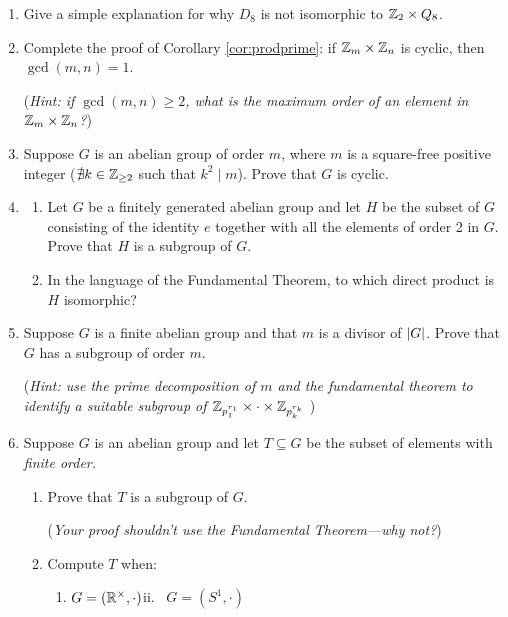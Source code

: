 \begin{exercises}
\begin{enumerate}
		
		\item Give a simple explanation for why $D_8$ is not isomorphic to $\mathbb{Z}_2\times Q_8$.
		
		
		\item\label{exs:corprodprime} Complete the proof of Corollary \ref{cor:prodprime}: if $\mathbb{Z}_m\times\mathbb{Z}_n$ is cyclic, then $\gcd(m,n)=1$.\par
		(\emph{Hint: if $\gcd(m,n)\ge 2$, what is the maximum order of an element in $\mathbb{Z}_m\times\mathbb{Z}_n$?})
	
	
		\item Suppose $G$ is an abelian group of order $m$, where $m$ is a square-free positive integer ($\nexists k\in \mathbb{Z}_{\ge 2}$ such that $k^2\!\mid\! m$). Prove that $G$ is cyclic.
	
	
		\item\begin{enumerate}
	  	\item Let $G$ be a finitely generated abelian group and let $H$ be the subset of $G$ consisting of the identity $e$ together with all the elements of order 2 in $G$. Prove that $H$ is a subgroup of $G$.
	  	\item In the language of the Fundamental Theorem, to which direct product is $H$ isomorphic?
		\end{enumerate}
		
		
		\item\label{exs:abeliansubgroup} Suppose $G$ is a finite abelian group and that $m$ is a divisor of $\left| G\right|$. Prove that $G$ has a subgroup of order $m$.\par
		(\emph{Hint: use the prime decomposition of $m$ and the fundamental theorem to identify a suitable subgroup of $\mathbb{Z}_{p_1^{r_1}}\times\cdot\times\mathbb{Z}_{p_k^{r_k}}$ })
		
	 	
		\item Suppose $G$ is an abelian group and let $T\subseteq G$ be the subset of elements with \emph{finite order.}
		\begin{enumerate}
		  \item Prove that $T$ is a subgroup of $G$.\par
		  (\emph{Your proof shouldn't use the Fundamental Theorem---why not?})
		  
		  \item Compute $T$ when:
		  \begin{enumerate}
		    \item $G=(\mathbb{R}^\times,\cdot)$\qquad\qquad ii. \ $G=(S^1,\cdot)$
			\end{enumerate}
		\end{enumerate}
	
	\end{enumerate}
\end{exercises}

